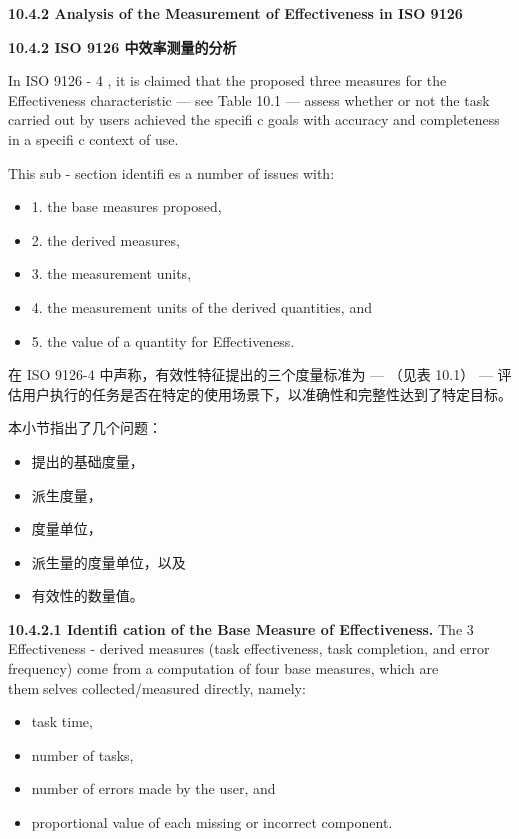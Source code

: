 \textbf{10.4.2 Analysis of the Measurement of Effectiveness in ISO 9126}

\textbf{10.4.2 ISO 9126 中效率测量的分析}

In ISO 9126 - 4 , it is claimed that the proposed three measures for the Effectiveness
characteristic — see Table 10.1 — assess whether or not the task carried out by 
users achieved the specifi c goals with accuracy and completeness in a specifi c 
context of use.

This sub - section identifi es a number of issues with: 
 
\begin{itemize}
  \item 1. the base measures proposed, 
  \item 2. the derived measures, 
  \item 3. the measurement units, 
  \item 4. the measurement units of the derived quantities, and 
  \item 5. the value of a quantity for Effectiveness.
\end{itemize}

在 ISO 9126-4 中声称，有效性特征提出的三个度量标准为 — （见表 10.1） — 评估用户执行的任务是否在特定的使用场景下，以准确性和完整性达到了特定目标。

本小节指出了几个问题：

\begin{itemize}
  \item 提出的基础度量，
  \item 派生度量，
  \item 度量单位，
  \item 派生量的度量单位，以及
  \item 有效性的数量值。
\end{itemize}

\textbf{10.4.2.1 Identifi cation of the Base Measure of Effectiveness.} The 3 Effectiveness - derived measures (task effectiveness, task completion, and error 
frequency) come from a computation of four base measures, which are them￾selves collected/measured directly, namely:

\begin{itemize}
 \item task time, 
 \item number of tasks, 
 \item number of errors made by the user, and 
 \item proportional value of each missing or incorrect component.
\end{itemize}

